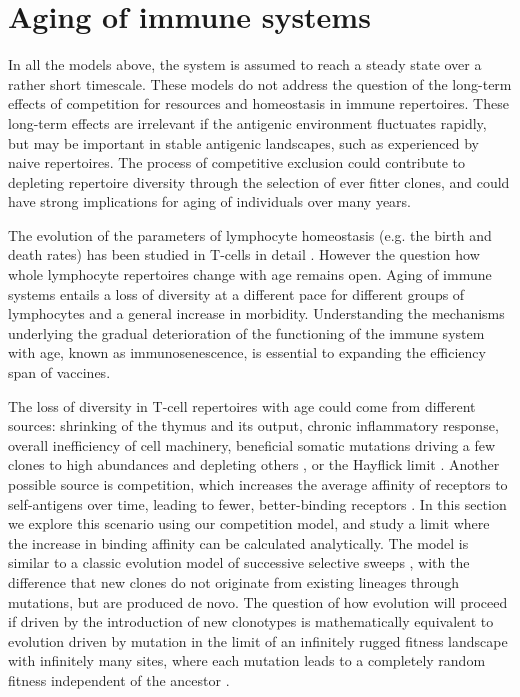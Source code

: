 \documentclass[aps,pre,twocolumn,superscriptaddress,groupedaddress]{revtex4}
\newcommand{\<}{\langle}
\renewcommand{\>}{\rangle}
\begin{document}
 \section{Aging of immune systems}
 \label{aging}
In all the models above, the system is assumed to reach a steady state over a rather short timescale. These models do not address the question of the long-term effects of competition for resources and homeostasis in immune repertoires. These long-term effects are irrelevant if the antigenic environment fluctuates rapidly, but may be important in stable antigenic landscapes, such as experienced by naive repertoires. The process of competitive exclusion could contribute to depleting repertoire diversity through the selection of ever fitter clones, and could have strong implications for aging of individuals over many years.
 
The evolution of the parameters of lymphocyte homeostasis (e.g. the birth and death rates) has been studied in T-cells in detail \cite{Bains2009,Bains2013a,Hapuarachchi2013}. However the question how whole lymphocyte repertoires change with age remains open. Aging of immune systems entails a loss of diversity at a different pace for different groups of lymphocytes \cite{Goronzy2007} and a general increase in morbidity. Understanding the mechanisms underlying the gradual deterioration of the functioning of the immune system with age, known as immunosenescence, is essential to expanding the efficiency span of vaccines.

The loss of diversity in T-cell repertoires with age could come from different sources: shrinking of the thymus and its output, chronic inflammatory response, overall inefficiency of cell machinery, beneficial somatic mutations driving a few clones to high abundances and depleting others \cite{antia-2012}, or the Hayflick limit \cite{Ndifon2016}. Another possible source is competition, which increases the average affinity of receptors to self-antigens over time, leading to fewer, better-binding receptors \cite{Lythe2016}.
In this section we explore this scenario using our competition model, and study a limit where the increase in binding affinity can be calculated analytically. The model is similar to a classic evolution model of successive selective sweeps \cite{Smith1974}, with the difference that new clones do not originate from existing lineages through mutations, but are produced de novo. The question of how evolution will proceed if driven by the introduction of new clonotypes is mathematically equivalent to evolution driven by mutation in the limit of an infinitely rugged fitness landscape with infinitely many sites, where each mutation leads to a completely random fitness independent of the ancestor \cite{Park2008,Neher2013a}.
\end{document}
